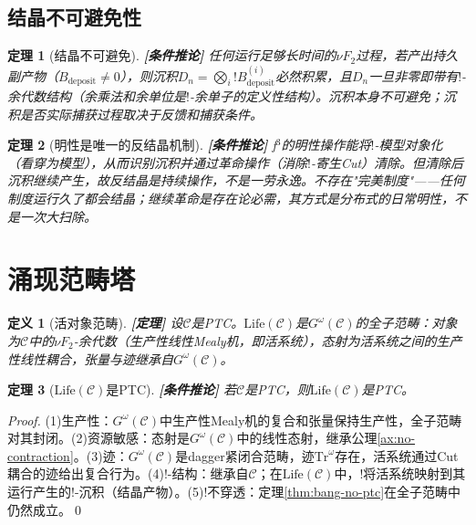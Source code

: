 \documentclass[11pt,a4paper]{article}
\newtheorem{definition}{定义}
\newtheorem{theorem}{定理}
\newcommand{\lvl}[1]{\hfill\textbf{\footnotesize[#1]}}
\newcommand{\lvP}{\lvl{定理}}
\newcommand{\lvC}{\lvl{条件推论}}
\newcommand{\bang}{{!}}
\begin{document}
\subsection{结晶不可避免性}

\begin{theorem}[结晶不可避免]\label{thm:crystallization-inevitable}\lvC
任何运行足够长时间的$\nu F_2$过程，若产出持久副产物（$B_{\mathrm{deposit}}\neq0$），则沉积$D_n=\bigotimes_i\bang B_{\mathrm{deposit}}^{(i)}$必然积累，且$D_n$一旦非零即带有$\bang$-余代数结构（余乘法和余单位是$\bang$-余单子的定义性结构）。沉积本身不可避免；沉积是否实际捕获过程取决于反馈和捕获条件。
\end{theorem}

\begin{theorem}[明性是唯一的反结晶机制]\label{thm:mingxing-anti-crystal}\lvC
f$^3$的明性操作能将$\bang$-模型对象化（看穿为模型），从而识别沉积并通过革命操作（消除$\bang$-寄生Cut）清除。但清除后沉积继续产生，故反结晶是持续操作，不是一劳永逸。不存在"完美制度"——任何制度运行久了都会结晶；继续革命是存在论必需，其方式是分布式的日常明性，不是一次大扫除。
\end{theorem}


\section{涌现范畴塔}

\begin{definition}[活对象范畴]\label{def:life-category}\lvP
设$\mathcal{C}$是PTC。$\mathrm{Life}(\mathcal{C})$是$G^\omega(\mathcal{C})$的全子范畴：对象为$\mathcal{C}$中的$\nu F_2$-余代数（生产性线性Mealy机，即活系统），态射为活系统之间的生产性线性耦合，张量与迹继承自$G^\omega(\mathcal{C})$。
\end{definition}

\begin{theorem}[$\mathrm{Life}(\mathcal{C})$是PTC]\label{thm:life-is-ptc}\lvC
若$\mathcal{C}$是PTC，则$\mathrm{Life}(\mathcal{C})$是PTC。
\end{theorem}

\begin{proof}
(1)生产性：$G^\omega(\mathcal{C})$中生产性Mealy机的复合和张量保持生产性，全子范畴对其封闭。(2)资源敏感：态射是$G^\omega(\mathcal{C})$中的线性态射，继承公理\ref{ax:no-contraction}。(3)迹：$G^\omega(\mathcal{C})$是dagger紧闭合范畴，迹$\mathrm{Tr}^\omega$存在，活系统通过Cut耦合的迹给出复合行为。(4)$\bang$-结构：继承自$\mathcal{C}$；在$\mathrm{Life}(\mathcal{C})$中，$\bang$将活系统映射到其运行产生的$\bang$-沉积（结晶产物）。(5)!不穿透：定理\ref{thm:bang-no-ptc}在全子范畴中仍然成立。\qed
\end{proof}
\end{document}
